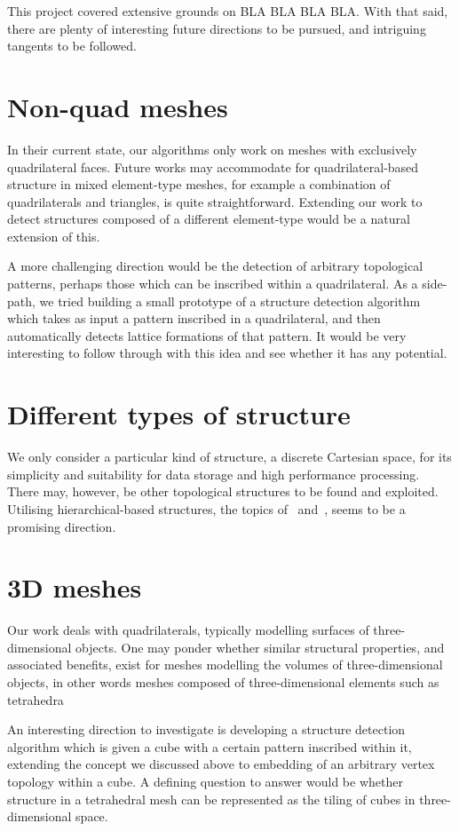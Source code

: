 This project covered extensive grounds on BLA BLA BLA BLA. With that said, there are plenty of interesting future directions to be pursued, and intriguing tangents to be followed.

\section{Non-quad meshes}
In their current state, our algorithms only work on meshes with exclusively quadrilateral faces. Future works may accommodate for quadrilateral-based structure in mixed element-type meshes, for example a combination of quadrilaterals and triangles, is quite straightforward. Extending our work to detect structures composed of a different element-type would be a natural extension of this.

A more challenging direction would be the detection of arbitrary topological patterns, perhaps those which can be inscribed within a quadrilateral. As a side-path, we tried building a small prototype of a structure detection algorithm which takes as input a pattern inscribed in a quadrilateral, and then automatically detects lattice formations of that pattern. It would be very interesting to follow through with this idea and see whether it has any potential.


\section{Different types of structure}
We only consider a particular kind of structure, a discrete Cartesian space, for its simplicity and suitability for data storage and high performance processing. There may, however, be other topological structures to be found and exploited. Utilising hierarchical-based structures, the topics of~\cite{li2004hierarchical} and~\cite{bergen2004hierarchical}, seems to be a promising direction.


\section{3D meshes}
Our work deals with quadrilaterals, typically modelling surfaces of three-dimensional objects. One may ponder whether similar structural properties, and associated benefits, exist for meshes modelling the volumes of three-dimensional objects, in other words meshes composed of three-dimensional elements such as tetrahedra

An interesting direction to investigate is developing a structure detection algorithm which is given a cube with a certain pattern inscribed within it, extending the concept we discussed above to embedding of an arbitrary vertex topology within a cube. A defining question to answer would be whether structure in a tetrahedral mesh can be represented as the tiling of cubes in three-dimensional space.


